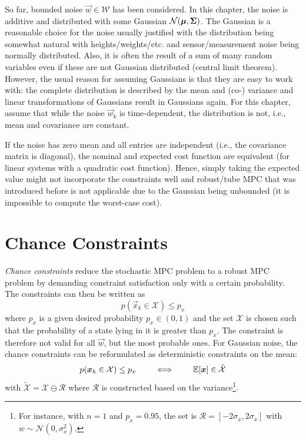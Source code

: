 	So far, bounded noise \( \vec{w} \in \mathcal{W} \) has been considered. In this chapter, the noise is additive and distributed with some Gaussian \( \mathcal{N}(\bm{\mu}, \bm{\mathrm{\Sigma}}) \). The Gaussian is a reasonable choice for the noise usually justified with the distribution being somewhat natural with heights/weights/etc. and sensor/measurement noise being normally distributed. Also, it is often the result of a sum of many random variables even if these are not Gaussian distributed (central limit theorem). However, the usual reason for assuming Gaussians is that they are easy to work with: the complete distribution is described by the mean and (co-) variance and linear transformations of Gaussians result in Gaussians again. For this chapter, assume that while the noise \(\vec{w}_k\) is time-dependent, the distribution is not, i.e., mean and covariance are constant.

	If the noise has zero mean and all entries are independent (i.e., the covariance matrix is diagonal), the nominal and expected cost function are equivalent (for linear systems with a quadratic cost function). Hence, simply taking the expected value might not incorporate the constraints well and robust/tube MPC that was introduced before is not applicable due to the Gaussian being unbounded (it is impossible to compute the worst-case cost).

	\section{Chance Constraints}
		\emph{Chance constraints} reduce the stochastic MPC problem to a robust MPC problem by demanding constraint satisfaction only with a certain probability. The constraints can then be written as
		\begin{equation}
			p(\vec{x}_k \in \mathcal{X}) \leq p_x
		\end{equation}
		where \(p_x\) is a given desired probability \( p_x \in (0, 1) \) and the set \(\mathcal{X}\) is chosen such that the probability of a state lying in it is greater than \(p_x\). The constraint is therefore not valid for all \(\vec{w}\), but the most probable ones. For Gaussian noise, the chance constraints can be reformulated as deterministic constraints on the mean:
		\begin{equation}
			p(\bm{x}_k \in \mathcal{X}) \leq p_x
			\qquad\iff\qquad
			\mathbb{E}[\bm{x}] \in \tilde{\mathcal{X}}
		\end{equation}
		with \( \tilde{\mathcal{X}} = \mathcal{X} \ominus \mathcal{R} \) where \(\mathcal{R}\) is constructed based on the variance\footnote{For instance, with \( n = 1 \) and \( p_x = 0.95 \), the set is \( \mathcal{R} = [-2 \sigma_x, 2 \sigma_x] \) with \( w \sim \mathcal{N}(0, \sigma_x^2) \).}.

